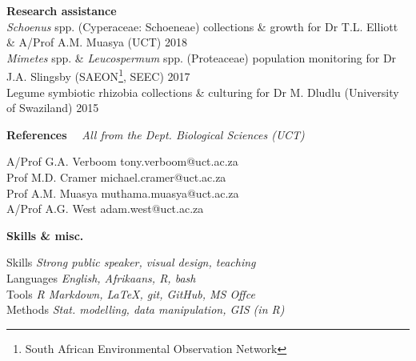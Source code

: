 \documentclass[10pt]{article}
\begin{document}
\textbf{Research assistance}\\ %

\textit{Schoenus} spp. (Cyperaceae: Schoeneae) collections \& growth for Dr
  T.L. Elliott \& A/Prof A.M. Muasya {\small (UCT)}      \hfill {\small 2018} \\
\textit{Mimetes} spp. \& \textit{Leucospermum} spp. (Proteaceae) population
  monitoring for Dr J.A. Slingsby {\small (SAEON\footnote{South African
  Environmental Observation Network}, SEEC)}             \hfill {\small 2017} \\
Legume symbiotic rhizobia collections \& culturing for Dr M. Dludlu
  {\small (University of Swaziland)}                        \hfill {\small 2015}

\hrulefill

\begin{multicols}{2}

\textbf{References} %
  ~~{\small \textmd{\textit{All from the Dept. Biological Sciences (UCT)}}}

A/Prof G.A. Verboom                             \hfill tony.verboom@uct.ac.za \\
Prof M.D. Cramer                              \hfill michael.cramer@uct.ac.za \\
Prof A.M. Muasya                              \hfill muthama.muasya@uct.ac.za \\
A/Prof A.G. West                                      \hfill adam.west@uct.ac.za

\columnbreak

\textbf{Skills \& misc.} %


Skills         \hfill \textit{Strong public speaker, visual design, teaching} \\
Languages                         \hfill \textit{English, Afrikaans, R, bash} \\
Tools                \hfill \textit{R Markdown, LaTeX, git, GitHub, MS Offce} \\
Methods           \hfill \textit{Stat. modelling, data manipulation, GIS (in R)}

\end{multicols}
\end{document}
